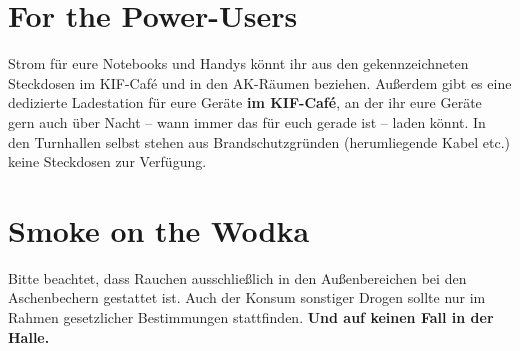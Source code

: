 \section*{For the Power-Users}

Strom für eure Notebooks und Handys könnt ihr aus den gekennzeichneten Steckdosen im KIF-Café und in den AK-Räumen beziehen.
Außerdem gibt es eine dedizierte Ladestation für eure Geräte \textbf{im KIF-Café}, an der ihr eure Geräte gern auch über Nacht -- wann immer das für euch gerade ist -- laden könnt.
In den Turnhallen selbst stehen aus Brandschutzgründen (herumliegende Kabel etc.) keine Steckdosen zur Verfügung.

\section*{Smoke on the Wodka}

Bitte beachtet, dass Rauchen ausschließlich in den Außenbereichen bei den Aschenbechern gestattet ist.
Auch der Konsum sonstiger Drogen sollte nur im Rahmen gesetzlicher Bestimmungen stattfinden. \textbf{Und auf keinen Fall in der Halle.}

